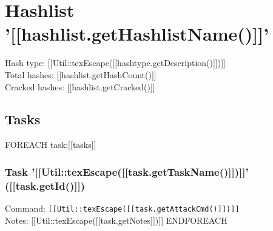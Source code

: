 \documentclass[12pt]{article}
\begin{document}
\section*{Hashlist '[[hashlist.getHashlistName()]]'}

Hash type: [[Util::texEscape([[hashtype.getDescription()]])]]\\
Total hashes: [[hashlist.getHashCount()]]\\
Cracked hashes: [[hashlist.getCracked()]]\\

\subsection*{Tasks}

{{FOREACH task;[[tasks]]}}
	\subsubsection*{Task '[[Util::texEscape([[task.getTaskName()]])]]' ([[task.getId()]])}
	Command: \texttt{[[Util::texEscape([[task.getAttackCmd()]])]]}\\
	Notes: [[Util::texEscape([[task.getNotes]])]]
{{ENDFOREACH}}
\end{document}
